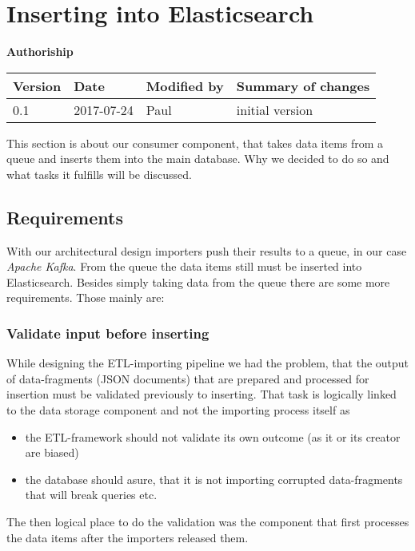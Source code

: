 \section{Inserting into
Elasticsearch}\label{inserting-into-elasticsearch}

\textbf{Authoriship}

\begin{longtable}[]{@{}llll@{}}
\toprule
Version & Date & Modified by & Summary of changes\tabularnewline
\midrule
\endhead
0.1 & 2017-07-24 & Paul & initial version\tabularnewline
\bottomrule
\end{longtable}

This section is about our consumer component, that takes data items from
a queue and inserts them into the main database. Why we decided to do so
and what tasks it fulfills will be discussed.

\subsection{Requirements}\label{requirements}

With our architectural design importers push their results to a queue,
in our case \emph{Apache Kafka}. From the queue the data items still
must be inserted into Elasticsearch. Besides simply taking data from the
queue there are some more requirements. Those mainly are:

\subsubsection{Validate input before
inserting}\label{validate-input-before-inserting}

While designing the ETL-importing pipeline we had the problem, that the
output of data-fragments (JSON documents) that are prepared and
processed for insertion must be validated previously to inserting. That
task is logically linked to the data storage component and not the
importing process itself as

\begin{itemize}
\tightlist
\item
  the ETL-framework should not validate its own outcome (as it or its
  creator are biased)
\item
  the database should asure, that it is not importing corrupted
  data-fragments that will break queries etc.
\end{itemize}

The then logical place to do the validation was the component that first
processes the data items after the importers released them.

